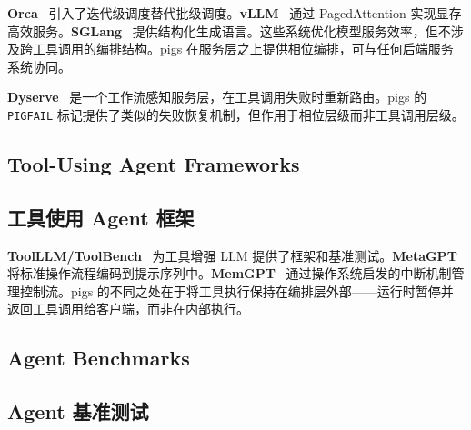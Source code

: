 \begin{chinese}
\textbf{Orca}~\citep{yu2022orca} 引入了迭代级调度替代批级调度。\textbf{vLLM}~\citep{kwon2023vllm} 通过 PagedAttention 实现显存高效服务。\textbf{SGLang}~\citep{zheng2024sglang} 提供结构化生成语言。这些系统优化模型服务效率，但不涉及跨工具调用的编排结构。pigs 在服务层之上提供相位编排，可与任何后端服务系统协同。
\end{chinese}

\begin{chinese}
\textbf{Dyserve}~\citep{dyserve2027} 是一个工作流感知服务层，在工具调用失败时重新路由。pigs 的 \texttt{PIGFAIL} 标记提供了类似的失败恢复机制，但作用于相位层级而非工具调用层级。
\end{chinese}

\subsection{Tool-Using Agent Frameworks}
\begin{chinese}
\subsection*{工具使用 Agent 框架}
\end{chinese}

\begin{chinese}
\textbf{ToolLLM/ToolBench}~\citep{qin2023toolllm} 为工具增强 LLM 提供了框架和基准测试。\textbf{MetaGPT}~\citep{hong2023metagpt} 将标准操作流程编码到提示序列中。\textbf{MemGPT}~\citep{packer2023memgpt} 通过操作系统启发的中断机制管理控制流。pigs 的不同之处在于将工具执行保持在编排层外部——运行时暂停并返回工具调用给客户端，而非在内部执行。
\end{chinese}

\subsection{Agent Benchmarks}
\begin{chinese}
\subsection*{Agent 基准测试}
\end{chinese}

